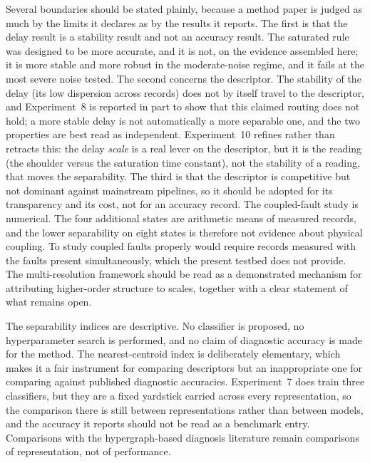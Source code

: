 \documentclass[10pt,a4paper,twocolumn]{article}
\begin{document}
Several boundaries should be stated plainly, because a method paper is
judged as much by the limits it declares as by the results it reports.  The
first is that the delay result is a stability result and not an accuracy
result.  The saturated rule was designed to be more accurate, and it is not,
on the evidence assembled here; it is more stable and more robust in the
moderate-noise regime, and it fails at the most severe noise tested.  The
second concerns the descriptor.  The stability of the delay (its low
dispersion across records) does not by itself travel to the descriptor, and
Experiment~8 is reported in part to show that this claimed routing does not
hold; a more stable delay is not automatically a more separable one, and the
two properties are best read as independent.  Experiment~10 refines rather
than retracts this: the delay \emph{scale} is a real lever on the descriptor,
but it is the reading (the shoulder versus the saturation time constant), not
the stability of a reading, that moves the separability.  The third is that the descriptor is
competitive but not dominant against mainstream pipelines, so it should be
adopted for its transparency and its cost, not for an accuracy record.  The
coupled-fault study is
numerical.  The four additional states are
arithmetic means of measured records, and the lower separability on eight
states is therefore not evidence about physical coupling.  To study coupled
faults properly would require records measured with the faults present
simultaneously, which the present testbed does not provide.  The
multi-resolution framework should be read as a demonstrated mechanism for
attributing higher-order structure to scales, together with a clear statement
of what remains open.

The separability indices are descriptive.  No classifier is proposed, no
hyperparameter search is performed, and no claim of diagnostic accuracy is made
for the method.  The nearest-centroid index is deliberately elementary, which
makes it a fair instrument for comparing descriptors but an inappropriate one
for comparing against published diagnostic accuracies.  Experiment~7 does train
three classifiers, but they are a fixed yardstick carried across every
representation, so the comparison there is still between representations rather
than between models, and the accuracy it reports should not be read as a
benchmark entry.  Comparisons with the hypergraph-based diagnosis literature
\citep{yan2022,yan2024,shi2023,su2023} remain comparisons of representation,
not of performance.
\end{document}
